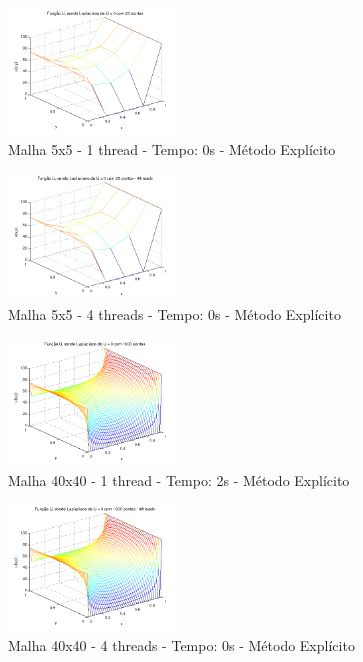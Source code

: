 \documentclass[journal]{IEEEtran}
\begin{document}
\begin{figure}[ht!]

\centering
\includegraphics[width = 0.4\textwidth]{figures/problema01_m1/01.png}
\caption{Malha 5x5 - 1 thread - Tempo: 0s - Método Explícito\label{malha5x5_1th}}
\end{figure}

\begin{figure}[ht!]

\centering
\includegraphics[width = 0.4\textwidth]{figures/problema01_m1/09.png}
\caption{Malha 5x5 - 4 threads - Tempo: 0s - Método Explícito\label{malha5x5_4th}}
\end{figure}

\newpage
\begin{figure}[ht!]

\centering
\includegraphics[width = 0.4\textwidth]{figures/problema01_m1/04.png}
\caption{Malha 40x40 - 1 thread - Tempo: 2s - Método Explícito\label{malha40x40_1th}}
\end{figure}

\begin{figure}[ht!]

\centering
\includegraphics[width = 0.4\textwidth]{figures/problema01_m1/10.png}
\caption{Malha 40x40 - 4 threads - Tempo: 0s - Método Explícito\label{malha40x40_4th}}
\end{figure}
\end{document}
